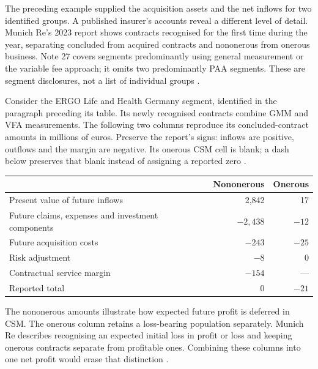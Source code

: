 The preceding example supplied the acquisition assets and the net inflows
for two identified groups. A published insurer's accounts reveal a different
level of detail. Munich Re's 2023 report shows contracts recognised for the
first time during the year, separating concluded from acquired contracts and
nononerous from onerous business. Note 27 covers segments predominantly using
general measurement or the variable fee approach; it omits two predominantly
PAA segments. These are segment disclosures, not a list of individual groups
\citep[printed pp. 252--254]{munichre2023annual}.

Consider the ERGO Life and Health Germany segment, identified in the paragraph
preceding its table. Its newly recognised contracts combine GMM and VFA
measurements. The following two columns reproduce its concluded-contract
amounts in millions of euros. Preserve the report's signs: inflows are positive,
outflows and the margin are negative. Its onerous CSM cell is blank; a dash
below preserves that blank instead of assigning a reported zero
\citep[printed pp. 252--253]{munichre2023annual}.

\begin{center}
\begin{tabular}{p{}rr}
\toprule
 & Nononerous & Onerous \\
\midrule
Present value of future inflows & 2,842 & 17 \\
Future claims, expenses and investment components & $-2,438$ & $-12$ \\
Future acquisition costs & $-243$ & $-25$ \\
Risk adjustment & $-8$ & 0 \\
Contractual service margin & $-154$ & --- \\
Reported total & 0 & $-21$ \\
\bottomrule
\end{tabular}
\end{center}

The nononerous amounts illustrate how expected future profit is deferred in
CSM. The onerous column retains a loss-bearing population separately. Munich
Re describes recognising an expected initial loss in profit or loss and
keeping onerous contracts separate from profitable ones. Combining these
columns into one net profit would erase that distinction
\citep[printed pp. 165--166]{munichre2023annual}.

